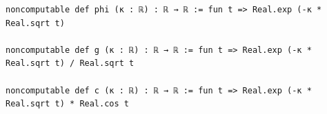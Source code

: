 \begin{Verbatim}[fontsize=\scriptsize,frame=single,framesep=1.5mm]
noncomputable def phi (κ : ℝ) : ℝ → ℝ := fun t => Real.exp (-κ * Real.sqrt t)

noncomputable def g (κ : ℝ) : ℝ → ℝ := fun t => Real.exp (-κ * Real.sqrt t) / Real.sqrt t

noncomputable def c (κ : ℝ) : ℝ → ℝ := fun t => Real.exp (-κ * Real.sqrt t) * Real.cos t
\end{Verbatim}
